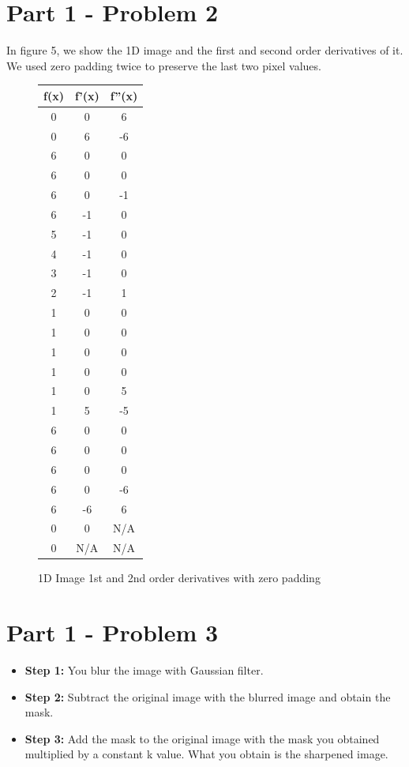 \documentclass[conference]{IEEEtran}
\begin{document}
\section*{Part 1 - Problem 2}

In figure 5, we show the 1D image and the first and second order derivatives of it. We used zero padding twice to preserve the last two pixel values.

\begin{figure}
\begin{center}
\begin{tabular}{ |c|c|c| } 
\hline
f(x) & f'(x) & f''(x)\\ \hline
0 & 0 & 6\\ \hline
0 & 6 & -6\\ \hline
6 & 0 & 0\\ \hline
6 & 0 & 0\\ \hline
6 & 0 & -1\\ \hline
6 & -1 & 0\\ \hline
5 & -1 & 0\\ \hline
4 & -1 & 0\\ \hline
3 & -1 & 0\\ \hline
2 & -1 & 1\\ \hline
1 & 0 & 0\\ \hline
1 & 0 & 0\\ \hline
1 & 0 & 0\\ \hline
1 & 0 & 0\\ \hline
1 & 0 & 5\\ \hline
1 & 5 & -5\\ \hline
6 & 0 & 0\\ \hline
6 & 0 & 0\\ \hline
6 & 0 & 0\\ \hline
6 & 0 & -6\\ \hline
6 & -6 & 6\\ \hline
0 & 0 & N/A\\ \hline
0 & N/A & N/A\\ \hline
\end{tabular}
\caption{1D Image 1st and 2nd order derivatives with zero padding}
\end{center}
\end{figure}

\section*{Part 1 - Problem 3}

\begin{itemize}
  \item \textbf{Step 1:} You blur the image with Gaussian filter.
  \item \textbf{Step 2:} Subtract the original image with the blurred image and obtain the mask.
  \item \textbf{Step 3:} Add the mask to the original image with the mask you obtained multiplied by a constant k value. What you obtain is the sharpened image.
\end{itemize}
\end{document}

